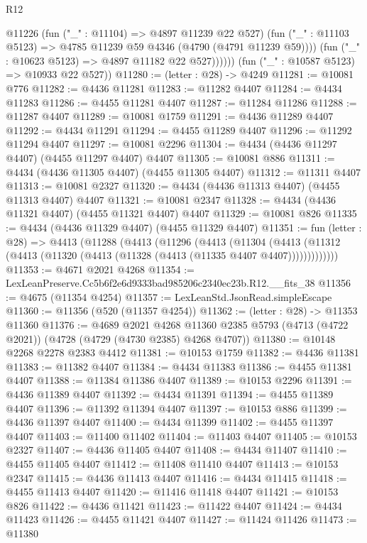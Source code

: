 \begin{lexlean}{R12}
\begin{coremodule}
                @11226
                  (fun ("_" : @11104) => @4897 @11239 @22 @527)
                  (fun ("_" : @11103 @5123) => @4785 @11239 @59 @4346 (@4790 (@4791 @11239 @59))))
                (fun ("_" : @10623 @5123) => @4897 @11182 @22 @527))))))
      (fun ("_" : @10587 @5123) => @10933 @22 @527))
@11280 := (letter : @28) -> @4249
@11281 := @10081 @776
@11282 := @4436 @11281
@11283 := @11282 @4407
@11284 := @4434 @11283
@11286 := @4455 @11281 @4407
@11287 := @11284 @11286
@11288 := @11287 @4407
@11289 := @10081 @1759
@11291 := @4436 @11289 @4407
@11292 := @4434 @11291
@11294 := @4455 @11289 @4407
@11296 := @11292 @11294 @4407
@11297 := @10081 @2296
@11304 := @4434 (@4436 @11297 @4407) (@4455 @11297 @4407) @4407
@11305 := @10081 @886
@11311 := @4434 (@4436 @11305 @4407) (@4455 @11305 @4407)
@11312 := @11311 @4407
@11313 := @10081 @2327
@11320 := @4434 (@4436 @11313 @4407) (@4455 @11313 @4407) @4407
@11321 := @10081 @2347
@11328 := @4434 (@4436 @11321 @4407) (@4455 @11321 @4407) @4407
@11329 := @10081 @826
@11335 := @4434 (@4436 @11329 @4407) (@4455 @11329 @4407)
@11351 := fun (letter : @28) =>
  @4413
    (@11288
      (@4413
        (@11296
          (@4413
            (@11304
              (@4413 (@11312 (@4413 (@11320 (@4413 (@11328 (@4413 (@11335 @4407 @4407)))))))))))))
@11353 := @4671 @2021 @4268
@11354 := LexLeanPreserve.Cc5b6f2e6d9333bad985206c2340ec23b.R12.__fits_38
@11356 := @4675 (@11354 @4254)
@11357 := LexLeanStd.JsonRead.simpleEscape
@11360 := @11356 (@520 (@11357 @4254))
@11362 := (letter : @28) -> @11353 @11360
@11376 := @4689
    @2021
    @4268
    @11360
    @2385
    @5793
    (@4713 (@4722 @2021))
    (@4728 (@4729 (@4730 @2385) @4268 @4707))
@11380 := @10148 @2268 @2278 @2383 @4412
@11381 := @10153 @1759
@11382 := @4436 @11381
@11383 := @11382 @4407
@11384 := @4434 @11383
@11386 := @4455 @11381 @4407
@11388 := @11384 @11386 @4407
@11389 := @10153 @2296
@11391 := @4436 @11389 @4407
@11392 := @4434 @11391
@11394 := @4455 @11389 @4407
@11396 := @11392 @11394 @4407
@11397 := @10153 @886
@11399 := @4436 @11397 @4407
@11400 := @4434 @11399
@11402 := @4455 @11397 @4407
@11403 := @11400 @11402
@11404 := @11403 @4407
@11405 := @10153 @2327
@11407 := @4436 @11405 @4407
@11408 := @4434 @11407
@11410 := @4455 @11405 @4407
@11412 := @11408 @11410 @4407
@11413 := @10153 @2347
@11415 := @4436 @11413 @4407
@11416 := @4434 @11415
@11418 := @4455 @11413 @4407
@11420 := @11416 @11418 @4407
@11421 := @10153 @826
@11422 := @4436 @11421
@11423 := @11422 @4407
@11424 := @4434 @11423
@11426 := @4455 @11421 @4407
@11427 := @11424 @11426
@11473 := @11380

\end{coremodule}
\end{lexlean}
